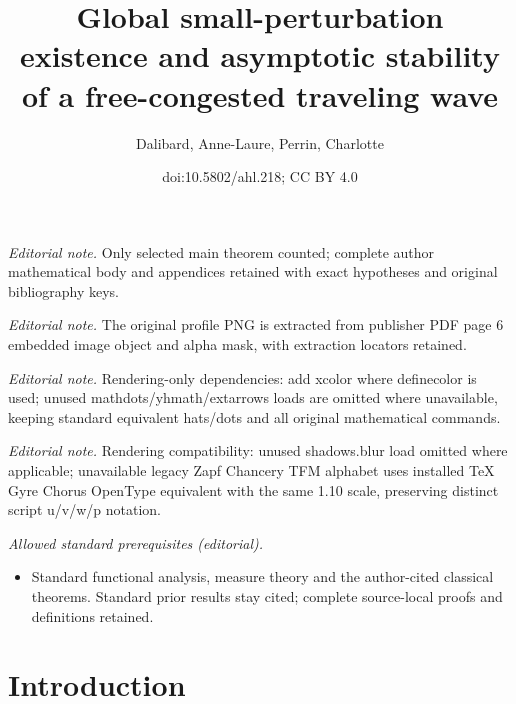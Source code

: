 \documentclass[10pt]{amsart}
\title{Global small-perturbation existence and asymptotic stability of a free-congested traveling wave}
\author{Dalibard, Anne-Laure, Perrin, Charlotte}
\date{doi:10.5802/ahl.218; CC BY 4.0}
\theoremstyle{definition}\newtheorem{defi}[theo]{Definition}\newtheorem{rema}[theo]{Remark}\newtheorem{exam}[theo]{Example}\newtheorem{exem}[theo]{Example}\newtheorem{nota}[theo]{Notation}
\begin{document}
\maketitle
\noindent\textit{Editorial note.} Only selected main theorem counted; complete author mathematical body and appendices retained with exact hypotheses and original bibliography keys.\par\medskip
\noindent\textit{Editorial note.} The original profile PNG is extracted from publisher PDF page 6 embedded image object and alpha mask, with extraction locators retained.\par\medskip
\noindent\textit{Editorial note.} Rendering-only dependencies: add xcolor where definecolor is used; unused mathdots/yhmath/extarrows loads are omitted where unavailable, keeping standard equivalent hats/dots and all original mathematical commands.\par\medskip
\noindent\textit{Editorial note.} Rendering compatibility: unused shadows.blur load omitted where applicable; unavailable legacy Zapf Chancery TFM alphabet uses installed TeX Gyre Chorus OpenType equivalent with the same 1.10 scale, preserving distinct script u/v/w/p notation.\par\medskip
\noindent\textit{Allowed standard prerequisites (editorial).}\begin{itemize}
\item Standard functional analysis, measure theory and the author-cited classical theorems. Standard prior results stay cited; complete source-local proofs and definitions retained.
\end{itemize}\medskip



\section{Introduction}
\end{document}
